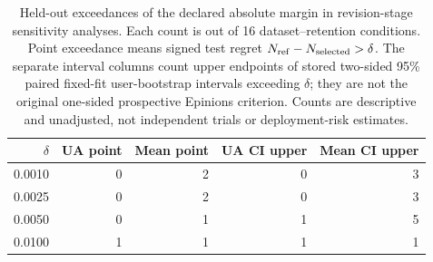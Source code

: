 \begin{table}[H]
\centering
\caption{Held-out exceedances of the declared absolute margin in revision-stage sensitivity analyses. Each count is out of 16 dataset--retention conditions. Point exceedance means signed test regret $N_{\rm ref}-N_{\rm selected}>\delta$. The separate interval columns count upper endpoints of stored two-sided 95\% paired fixed-fit user-bootstrap intervals exceeding $\delta$; they are not the original one-sided prospective Epinions criterion. Counts are descriptive and unadjusted, not independent trials or deployment-risk estimates.}
\label{tab:coverage-margin-exceedance}
\small
\setlength{\tabcolsep}{4pt}
\begin{tabular}{@{}rrrrr@{}}
\toprule
$\delta$ & UA point & Mean point & UA CI upper & Mean CI upper \\
\midrule
0.0010 & 0 & 2 & 0 & 3 \\
0.0025 & 0 & 2 & 0 & 3 \\
0.0050 & 0 & 1 & 1 & 5 \\
0.0100 & 1 & 1 & 1 & 1 \\
\bottomrule
\end{tabular}
\end{table}
